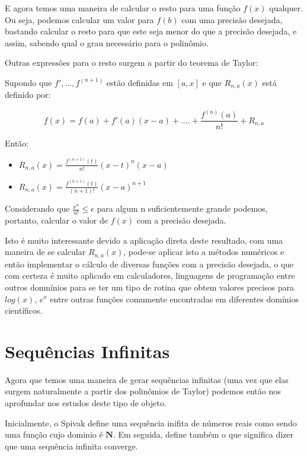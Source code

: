 \documentclass[a4paper, 12pt]{article}
\begin{document}
E agora temos uma maneira de calcular o resto para uma função $f(x)$ qualquer. Ou seja,
podemos calcular um valor para $f(b)$ com uma precisão desejada, bastando calcular o resto para que
este seja menor do que a precisão desejada, e assim, sabendo qual o grau necessário para o
polinômio.

Outras expressões para o resto surgem a partir do teorema de Taylor:

Supondo que $f',...,f^{(n+1)}$ estão definidas em $[a,x]$ e que $R_{n,a}(x)$ está definido por:

\begin{equation}
	f(x) = f(a) + f'(a)(x-a) + .... + \frac{f^{(n)}(a)}{n!} + R_{n,a}
\end{equation}

Então:

\begin{itemize}
	\item $R_{n,a}(x) = \frac{f^{(n+1)}(t)}{n!}(x-t)^n (x-a)$
	\item $R_{n,a}(x) = \frac{f^{(n+1)}(t)}{(n + 1)!}(x-a)^{n+1}$
\end{itemize}

Considerando que $\frac{x^n}{n!} \leq \epsilon$ para algum n suficientemente
grande podemos, portanto, calcular o valor de $f(x)$ com a precisão desejada. 

Isto é muito interessante devido a aplicação direta deste resultado, com uma maneira
de se calcular $R_{n,a}(x)$, pode-se aplicar isto a métodos numéricos e então
implementar o cálculo de diversas funções com a precisão desejada, o que com certeza
é muito aplicado em calculadores, linguagens de programação entre outros domnínios
para se ter um tipo de rotina que obtem valores precisos para $log(x)$, $e^x$ entre
outras funções comumente encontradas em diferentes domínios científicos.


\newpage

\section{Sequências Infinitas}

Agora que temos uma maneira de gerar sequências infinitas (uma vez que elas surgem
naturalmente a partir dos polinômios de Taylor) podemos então nos aprofundar nos
estudos deste tipo de objeto.

Inicialmente, o Spivak define uma sequência inifita de números reais como sendo uma função
cujo dominio é $\mathbf{N}$. Em seguida, define também o que significa dizer que uma sequência
infinita converge.
\end{document}
